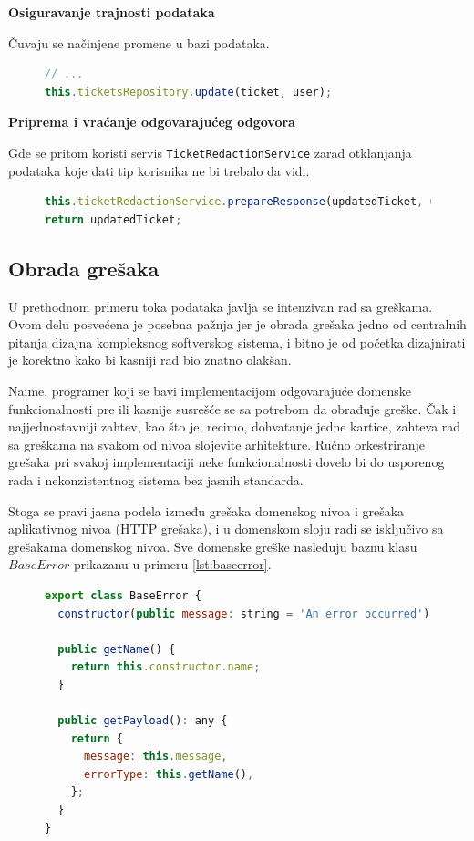 \documentclass[12pt,oneside]{memoir}
\begin{document}
\textbf{Osiguravanje trajnosti podataka}

Čuvaju se načinjene promene u bazi podataka.
\begin{figure}[h]
\begin{lstlisting}[language=JavaScript, style=ES6, caption={Korak očuvanja trajnosti podataka.}]
// ...
this.ticketsRepository.update(ticket, user);
\end{lstlisting}
\end{figure}

\newpage
\textbf{Priprema i vraćanje odgovarajućeg odgovora}

Gde se pritom koristi servis \verb|TicketRedactionService| zarad otklanjanja podataka koje dati tip korisnika ne bi trebalo da vidi.
\begin{figure}[h]
\begin{lstlisting}[language=JavaScript, style=ES6, caption={Korak pripreme i vraćanja odgovora.}]
this.ticketRedactionService.prepareResponse(updatedTicket, user);
return updatedTicket;
\end{lstlisting}
\end{figure}

\newpage
\subsection{Obrada grešaka}

U prethodnom primeru toka podataka javlja se intenzivan rad sa greškama. Ovom delu posvećena je posebna pažnja jer je obrada grešaka jedno od centralnih pitanja dizajna kompleksnog softverskog sistema, i bitno je od početka dizajnirati je korektno kako bi kasniji rad bio znatno olakšan.

Naime, programer koji se bavi implementacijom odgovarajuće domenske funkcionalnosti pre ili kasnije susrešće se sa potrebom da obrađuje greške. Čak i najjednostavniji zahtev, kao što je, recimo, dohvatanje jedne kartice, zahteva rad sa greškama na svakom od nivoa slojevite arhitekture. Ručno orkestriranje grešaka pri svakoj implementaciji neke funkcionalnosti dovelo bi do usporenog rada i nekonzistentnog sistema bez jasnih standarda. 

Stoga se pravi jasna podela između grešaka domenskog nivoa i grešaka aplikativnog nivoa (HTTP grešaka), i u domenskom sloju radi se isključivo sa grešakama domenskog nivoa. Sve domenske greške nasleđuju baznu klasu $BaseError$ prikazanu u primeru \ref{lst:baseerror}.

\begin{figure}[h]
\begin{lstlisting}[language=JavaScript, style=ES6, caption={BaseError.ts}, label={lst:baseerror}]
export class BaseError {
  constructor(public message: string = 'An error occurred') {}

  public getName() {
    return this.constructor.name;
  }

  public getPayload(): any {
    return {
      message: this.message,
      errorType: this.getName(),
    };
  }
}
\end{lstlisting}
\end{figure}
\end{document}
